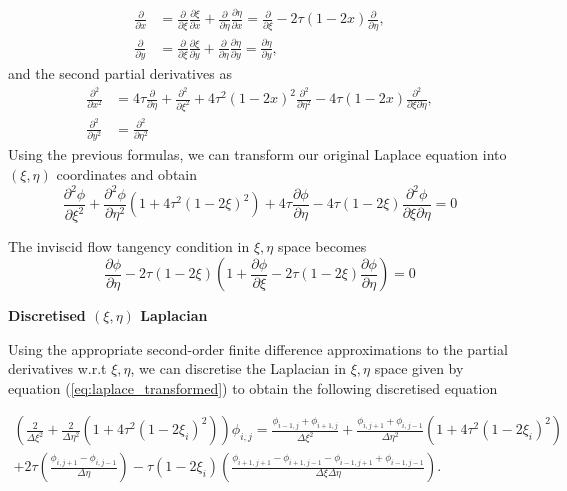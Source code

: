 \documentclass[12pt]{article}
\begin{document}
    \begin{align*}
        \frac{\partial}{\partial x} &= \frac{\partial}{\partial \xi}\frac{\partial\xi}{\partial x} + \frac{\partial}{\partial \eta} \frac{\partial\eta}{\partial x} = \frac{\partial}{\partial \xi} - 2\tau(1 - 2x)\frac{\partial}{\partial \eta}, \\
        \frac{\partial}{\partial y} &= \frac{\partial}{\partial \xi}\frac{\partial\xi}{\partial y} + \frac{\partial}{\partial \eta} \frac{\partial\eta}{\partial y} = \frac{\partial\eta}{\partial y},
    \end{align*}
    and the second partial derivatives as
    \begin{align*}
        \frac{\partial^2}{\partial x^2} &= 4\tau \frac{\partial}{\partial \eta} + \frac{\partial^2}{\partial \xi^2} + 4\tau^2(1 - 2x)^2\frac{\partial^2}{\partial \eta^2} - 4\tau(1-2x)\frac{\partial^2}{\partial \xi \partial \eta}, \\
        \frac{\partial^2}{\partial y^2} &= \frac{\partial^2}{\partial \eta^2}
    \end{align*}
    Using the previous formulas, we can transform our original Laplace equation into $(\xi, \eta)$ coordinates and obtain
    \begin{equation}\label{eq:laplace_transformed}
        \frac{\partial^2\phi}{\partial \xi^2} + \frac{\partial^2\phi}{\partial \eta^2}(1 + 4\tau^2(1-2\xi)^2) + 4\tau\frac{\partial\phi}{\partial \eta} - 4\tau(1-2\xi)\frac{\partial^2\phi}{\partial \xi \partial \eta} = 0
    \end{equation}

    The inviscid flow tangency condition in $\xi, \eta$ space becomes
    \begin{equation}
        \frac{\partial\phi}{\partial \eta} - 2\tau(1-2\xi)\left(1 + \frac{\partial\phi}{\partial \xi} - 2\tau(1-2\xi)\frac{\partial\phi}{\partial \eta}\right) = 0
    \end{equation}

    \newpage
    \textbf{Discretised $(\xi, \eta)$ Laplacian}

    Using the appropriate second-order finite difference approximations to the partial derivatives w.r.t $\xi, \eta$, we can discretise the Laplacian in $\xi, \eta$ space given by equation (\ref{eq:laplace_transformed}) to obtain the following discretised equation

    \begin{align*}
        \left(\frac{2}{\Delta \xi^2} + \frac{2}{\Delta \eta^2}(1 + 4\tau^2(1-2\xi_i)^2)\right)\phi_{i,j} = \frac{\phi_{i-1, j} + \phi_{i+1, j}}{\Delta \xi^2} + \frac{\phi_{i, j+1} + \phi_{i, j-1}}{\Delta \eta^2}(1 + 4\tau^2(1-2\xi_i)^2) \\
        + 2\tau \left(\frac{\phi_{i, j+1} - \phi_{i, j-1}}{\Delta \eta}\right) - \tau(1 - 2\xi_i)\left(\frac{\phi_{i+1,j+1} - \phi_{i+1,j-1} - \phi_{i-1,j+1} + \phi_{i-1,j-1}}{\Delta \xi \Delta \eta}\right).
    \end{align*}
\end{document}
